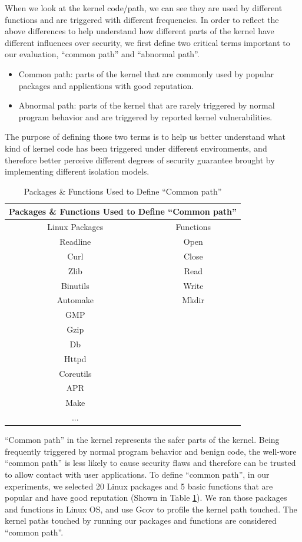 When we look at the kernel code/path, we can see they are used by different functions and are triggered with 
different frequencies. 
In order to reflect the above differences to help understand how different parts of the kernel have different influences 
over security,
we first define two critical terms important to our evaluation, ``common path'' and ``abnormal path''.

\begin{itemize} 
  \item Common path: parts of the kernel that are commonly used by popular packages and applications with good reputation. 
  \item Abnormal path: parts of the kernel that are rarely triggered by normal program behavior and are triggered 
  by reported kernel vulnerabilities. 
\end{itemize}

The purpose of defining those two terms is to help us better understand what kind of kernel code has been triggered 
under different environments, and therefore better perceive different degrees of security guarantee brought by 
implementing different isolation models. 


\begin{table}
\begin{tabular}{cc}
\toprule
\multicolumn{2}{c}{Packages \& Functions Used to Define ``Common path''} \\

\midrule
Linux Packages    &  Functions \\
\midrule
Readline & Open \\
Curl & Close \\
Zlib & Read \\
Binutils & Write \\
Automake & Mkdir \\
GMP & \\
Gzip & \\
Db & \\
Httpd & \\
Coreutils & \\
APR & \\
Make & \\
... & \\

\bottomrule
\end{tabular}
\caption {Packages \& Functions Used to Define ``Common path''}
\label{table:common_path}
\end{table}


``Common path'' in the kernel represents the safer parts of the kernel. Being frequently triggered by normal program behavior 
and benign code, the well-wore ``common path'' is less likely to cause security flaws and therefore can be trusted to allow 
contact with user applications. To define ``common path'', in our experiments, we selected 20 Linux packages and 5 basic 
functions that are popular and have good reputation (Shown in Table \ref{table:common_path}). We ran those packages and 
functions in Linux OS, and use Gcov to profile the kernel path touched. The kernel paths touched by running our packages and 
functions are considered ``common path''. 

